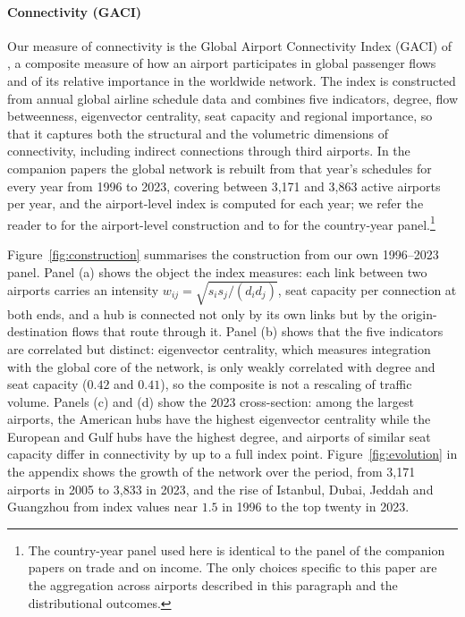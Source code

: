 \paragraph{Connectivity (GACI)}
Our measure of connectivity is the Global Airport Connectivity Index (GACI) of \citet{Cheung_2020}, a composite measure of how an airport participates in global passenger flows and of its relative importance in the worldwide network. The index is constructed from annual global airline schedule data and combines five indicators, degree, flow betweenness, eigenvector centrality, seat capacity and regional importance, so that it captures both the structural and the volumetric dimensions of connectivity, including indirect connections through third airports. In the companion papers the global network is rebuilt from that year's schedules for every year from 1996 to 2023, covering between 3{,}171 and 3{,}863 active airports per year, and the airport-level index is computed for each year; we refer the reader to \citet{Cheung_2020} for the airport-level construction and to \citet{Yue_2026} for the country-year panel.\footnote{The country-year panel used here is identical to the panel of the companion papers on trade and on income. The only choices specific to this paper are the aggregation across airports described in this paragraph and the distributional outcomes.}

Figure~\ref{fig:construction} summarises the construction from our own 1996--2023 panel. Panel (a) shows the object the index measures: each link between two airports carries an intensity $w_{ij}=\sqrt{s_i s_j/(d_i d_j)}$, seat capacity per connection at both ends, and a hub is connected not only by its own links but by the origin-destination flows that route through it. Panel (b) shows that the five indicators are correlated but distinct: eigenvector centrality, which measures integration with the global core of the network, is only weakly correlated with degree and seat capacity ($0.42$ and $0.41$), so the composite is not a rescaling of traffic volume. Panels (c) and (d) show the 2023 cross-section: among the largest airports, the American hubs have the highest eigenvector centrality while the European and Gulf hubs have the highest degree, and airports of similar seat capacity differ in connectivity by up to a full index point. Figure~\ref{fig:evolution} in the appendix shows the growth of the network over the period, from 3{,}171 airports in 2005 to 3{,}833 in 2023, and the rise of Istanbul, Dubai, Jeddah and Guangzhou from index values near $1.5$ in 1996 to the top twenty in 2023.

